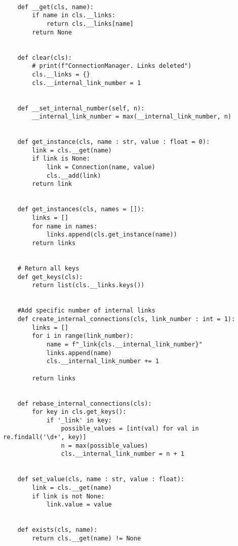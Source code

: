 \begin{verbatim}
    
    def __get(cls, name):
        if name in cls.__links:
            return cls.__links[name]
        return None
    
    
    def clear(cls):
        # print(f"ConnectionManager. Links deleted")
        cls.__links = {}
        cls.__internal_link_number = 1
    
    
    def __set_internal_number(self, n):
        __internal_link_number = max(__internal_link_number, n)
    
    
    def get_instance(cls, name : str, value : float = 0):
        link = cls.__get(name)
        if link is None:
            link = Connection(name, value)
            cls.__add(link)
        return link
    
    
    def get_instances(cls, names = []):
        links = []
        for name in names:
            links.append(cls.get_instance(name))
        return links
    
    
    # Return all keys
    def get_keys(cls):
        return list(cls.__links.keys())
    
    
    #Add specific number of internal links
    def create_internal_connections(cls, link_number : int = 1):
        links = []
        for i in range(link_number):
            name = f"_link{cls.__internal_link_number}"
            links.append(name)
            cls.__internal_link_number += 1
        
        return links
    
    
    def rebase_internal_connections(cls):
        for key in cls.get_keys():
            if '_link' in key:
                possible_values = [int(val) for val in re.findall('\d+', key)]
                n = max(possible_values)
                cls.__internal_link_number = n + 1
    
    
    def set_value(cls, name : str, value : float):
        link = cls.__get(name)
        if link is not None:
            link.value = value
    
    
    def exists(cls, name):
        return cls.__get(name) != None
\end{verbatim}


